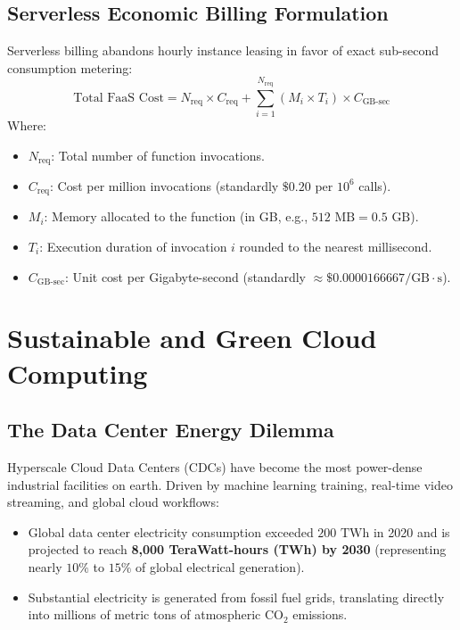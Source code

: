\subsection{Serverless Economic Billing Formulation}
Serverless billing abandons hourly instance leasing in favor of exact sub-second consumption metering:
\begin{equation}
\text{Total FaaS Cost} = N_{\text{req}} \times C_{\text{req}} + \sum_{i=1}^{N_{\text{req}}} \left( M_i \times T_i \right) \times C_{\text{GB-sec}}
\end{equation}
Where:
\begin{itemize}[leftmargin=*]
  \item $N_{\text{req}}$: Total number of function invocations.
  \item $C_{\text{req}}$: Cost per million invocations (standardly $\$0.20$ per $10^6$ calls).
  \item $M_i$: Memory allocated to the function (in GB, e.g., $512\text{ MB} = 0.5\text{ GB}$).
  \item $T_i$: Execution duration of invocation $i$ rounded to the nearest millisecond.
  \item $C_{\text{GB-sec}}$: Unit cost per Gigabyte-second (standardly $\approx \$0.0000166667 / \text{GB}\cdot\text{s}$).
\end{itemize}

\section{Sustainable and Green Cloud Computing}
\subsection{The Data Center Energy Dilemma}
Hyperscale Cloud Data Centers (CDCs) have become the most power-dense industrial facilities on earth. Driven by machine learning training, real-time video streaming, and global cloud workflows:
\begin{itemize}[leftmargin=*]
  \item Global data center electricity consumption exceeded $200\text{ TWh}$ in 2020 and is projected to reach \textbf{8,000 TeraWatt-hours (TWh) by 2030} (representing nearly $10\%$ to $15\%$ of global electrical generation).
  \item Substantial electricity is generated from fossil fuel grids, translating directly into millions of metric tons of atmospheric $\text{CO}_2$ emissions.
\end{itemize}

